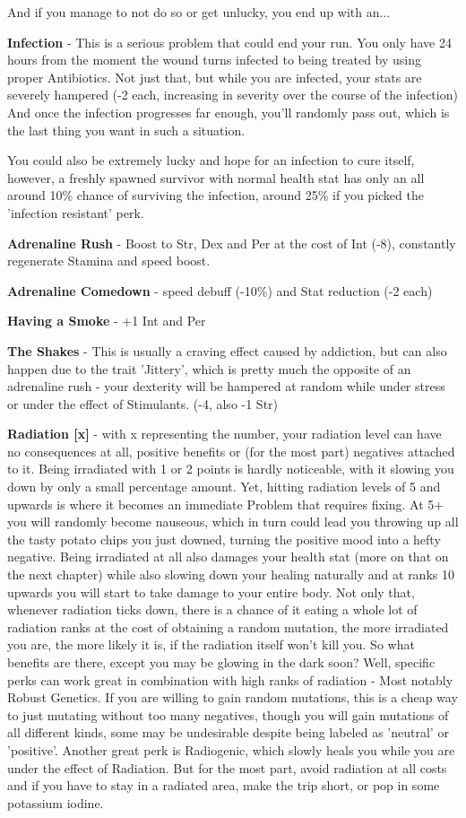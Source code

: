 And if you manage to not do so or get unlucky, you end up with an...

\textbf{Infection} - This is a serious problem that could end your run. You only have 24 hours from the moment the wound turns infected to being treated by using proper Antibiotics. Not just that, but while you are infected, your stats are severely hampered (-2 each, increasing in severity over the course of the infection) And once the infection progresses far enough, you'll randomly pass out, which is the last thing you want in such a situation.

You could also be extremely lucky and hope for an infection to cure itself, however, a freshly spawned survivor with normal health stat has only an all around 10\% chance of surviving the infection, around 25\% if you picked the 'infection resistant' perk.

\textbf{Adrenaline Rush} - Boost to Str, Dex and Per at the cost of Int (-8), constantly regenerate Stamina and speed boost.

\textbf{Adrenaline Comedown} - speed debuff (-10\%) and Stat reduction (-2 each)

\textbf{Having a Smoke} - +1 Int and Per

\textbf{The Shakes} - This is usually a craving effect caused by addiction, but can also happen due to the trait 'Jittery', which is pretty much the opposite of an adrenaline rush - your dexterity will be hampered at random while under stress or under the effect of Stimulants. (-4, also -1 Str)

\textbf{Radiation [x]} - with x representing the number, your radiation level can have no consequences at all, positive benefits or (for the most part) negatives attached to it. Being irradiated with 1 or 2 points is hardly noticeable, with it slowing you down by only a small percentage amount. Yet, hitting radiation levels of 5 and upwards is where it becomes an immediate Problem that requires fixing. At 5+ you will randomly become nauseous, which in turn could lead you throwing up all the tasty potato chips you just downed, turning the positive mood into a hefty negative. Being irradiated at all also damages your health stat (more on that on the next chapter) while also slowing down your healing naturally and at ranks 10 upwards you will start to take damage to your entire body. Not only that, whenever radiation ticks down, there is a chance of it eating a whole lot of radiation ranks at the cost of obtaining a random mutation, the more irradiated you are, the more likely it is, if the radiation itself won't kill you. So what benefits are there, except you may be glowing in the dark soon? Well, specific perks can work great in combination with high ranks of radiation - Most notably Robust Genetics. If you are willing to gain random mutations, this is a cheap way to just mutating without too many negatives, though you will gain mutations of all different kinds, some may be undesirable despite being labeled as 'neutral' or 'positive'. Another great perk is Radiogenic, which slowly heals you while you are under the effect of Radiation. But for the most part, avoid radiation at all costs and if you have to stay in a radiated area, make the trip short, or pop in some potassium iodine.

